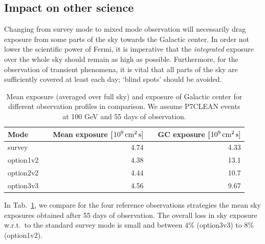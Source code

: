 \documentclass[aps,prd,superscriptaddress,nofootinbib,fixlfloat, 12pt]{revtex4-1}
\begin{document}
\subsection{Impact on other science}
Changing from survey mode to mixed mode observation will necessarily drag
exposure from some parts of the sky towards the Galactic center. In order not
lower the scientific power of Fermi, it is imperative that the
\emph{integrated} exposure over the whole sky should remain as high as
possible. Furthermore, for the observation of transient phenomena, it is vital
that all parts of the sky are sufficiently covered at least each day; `blind
spots' should be avoided.

\begin{table}[t]
  \begin{tabular}{lcrcr}
    \hline
    Mode && Mean exposure [$10^9\rm\,cm^2\,s]$ && GC exposure
    [$10^9\rm\,cm^2\,s]$ \\\hline
    survey && 4.74 && 4.33 \\
    option1v2 && 4.38 && 13.1 \\
    option2v2 && 4.44 && 10.7 \\
    option3v3 && 4.56 && 9.67  \\
    \hline
  \end{tabular}
  \caption{Mean exposure (averaged over full
  sky) and exposure of Galactic center for different observation profiles in comparison.
  We assume P7CLEAN events at 100 GeV and 55 days of observation.}
  \label{tab:exposures}
\end{table}

In Tab.~\ref{tab:exposures}, we compare for the four reference observations
strategies the mean sky exposures obtained after 55 days of observation. The
overall loss in sky exposure w.r.t.~to the standard survey mode is small and
between $4\%$ (option3v3) to $8\%$ (option1v2).
\end{document}
